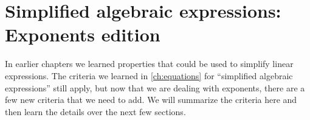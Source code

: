 %
%
%
%
%
%
%
%
%
%

\section{Simplified algebraic expressions: Exponents edition}

In earlier chapters we learned properties that could be used to simplify linear expressions. The criteria we learned in \cref{ch:equations} for ``simplified algebraic expressions'' still apply, but now that we are dealing with exponents, there are a few new criteria that we need to add. We will summarize the criteria here and then learn the details over the next few sections.

